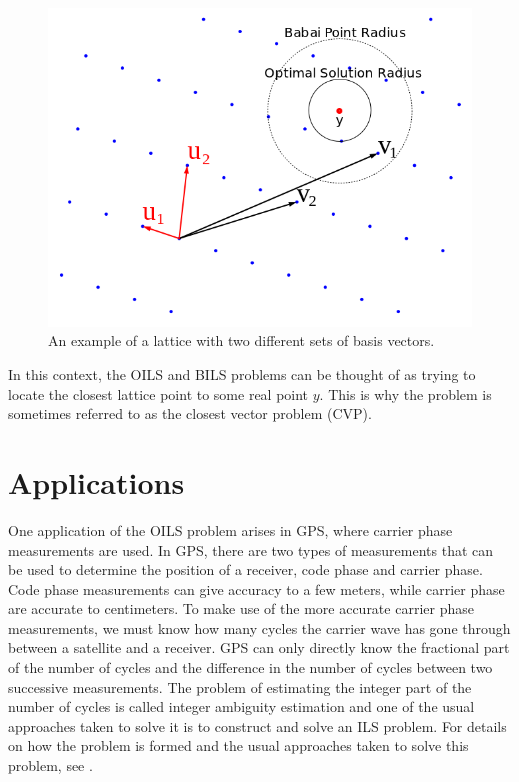 \documentclass[12pt,Bold,letterpaper]{mcgilletdclass}
\newcommand{\vsp}{\vspace{\baselineskip}}
\begin{document}
\begin{figure}
\centering
\includegraphics[scale=0.4]{latticebasis.png}
\caption{An example of a lattice with two different sets of basis vectors.}
\label{fig:latticeBasis}
\end{figure}

In this context, the OILS and BILS problems can be thought of as trying to locate the closest lattice point to some real point $y$. This is why the problem is sometimes referred to as the closest vector problem (CVP).

\vsp \section{Applications}
One application of the OILS problem arises in GPS, where carrier phase measurements are used. In GPS, there are two types of measurements that can be used to determine the position of a receiver, code phase and carrier phase. Code phase measurements can give accuracy to a few meters, while carrier phase are accurate to centimeters. To make use of the more accurate carrier phase measurements, we must know how many cycles the carrier wave has gone through between a satellite and a receiver. GPS can only directly know the fractional part of the number of cycles and the difference in the number of cycles between two successive measurements. The problem of estimating the integer part of the number of cycles is called integer ambiguity estimation and one of the usual approaches taken to solve it is to construct and solve an ILS problem. For details on how the problem is formed and the usual approaches taken to solve this problem, see \cite{Xu07}. 
\end{document}
